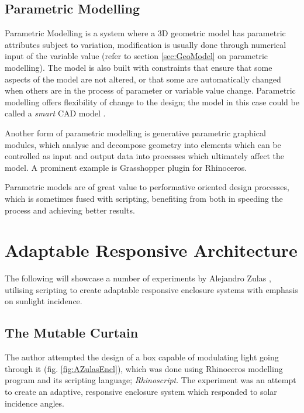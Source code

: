 \subsection{Parametric Modelling}

Parametric Modelling is a system where a 3D geometric model has parametric attributes subject to variation, modification is usually done through numerical input of the variable value (refer to section \ref{sec:GeoModel} on parametric modelling). The model is also built with constraints that ensure that some aspects of the model are not altered, or that some are automatically changed when others are in the process of parameter or variable value change. Parametric modelling offers flexibility of change to the design; the model in this case could be called a \emph{smart} CAD model \cite{kashyap01}.

Another form of parametric modelling is generative parametric graphical modules, which analyse and decompose geometry into elements which can be controlled as input and output data into processes which ultimately affect the model. A prominent example is Grasshopper plugin for Rhinoceros.

Parametric models are of great value to performative oriented design processes, which is sometimes fused with scripting, benefiting from both in speeding the process and achieving better results.

\clearpage
\section{Adaptable Responsive Architecture}

The following will showcase a number of experiments by Alejandro Zulas \cite{zulas04}, utilising scripting to create adaptable responsive enclosure systems with emphasis on sunlight incidence.

\subsection{The Mutable Curtain}

The author attempted the design of a box capable of modulating light going through it (fig. \ref{fig:AZulasEncl}), which was done using Rhinoceros modelling program and its scripting language; \emph{Rhinoscript}. The experiment was an attempt to create an adaptive, responsive enclosure system which responded to solar incidence angles. 

